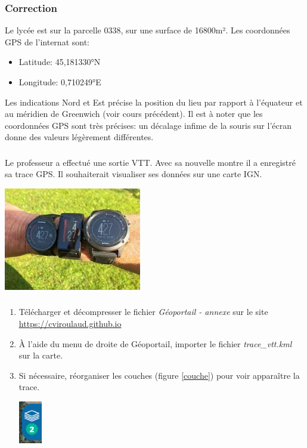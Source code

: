 \documentclass[svgnames,11pt]{beamer}
\begin{document}
\begin{frame}
    \frametitle{Correction}

    Le lycée est sur la parcelle 0338, sur une surface de 16800m². Les coordonnées GPS de l'internat sont:
\begin{itemize}
    \item Latitude: 45,181330°N
    \item Longitude: 0,710249°E
\end{itemize}
Les indications Nord et Est précise la position du lieu par rapport à l'équateur et au méridien de Greenwich (voir cours précédent). Il est à noter que les coordonnées GPS sont très précises: un décalage infime de la souris sur l'écran donne des valeurs légèrement différentes.

\end{frame}
\begin{frame}
    \frametitle{}

    Le professeur a effectué une sortie VTT. Avec sa nouvelle montre il a enregistré sa trace GPS. Il souhaiterait visualiser ses données sur une carte IGN.
    \begin{center}
    \centering
    \includegraphics[width=6cm]{ressources/montre.jpeg}
    \end{center}

\end{frame}
\begin{frame}
    \frametitle{}

    
\begin{activite}
\begin{enumerate}
    \item Télécharger et décompresser le fichier \emph{Géoportail - annexe} sur le site \url{https://cviroulaud.github.io}
    \item À l'aide du menu de droite de Géoportail, importer le fichier \emph{trace\_vtt.kml} sur la carte.
    \item Si nécessaire, réorganiser les couches (figure \ref{couche}) pour voir apparaître la trace.
    \begin{center}
    \centering
    \includegraphics[width=1cm]{ressources/droite-2.png}
    \label{couche}
    \end{center}
    
\end{enumerate}
\end{activite}

\end{frame}
\end{document}
